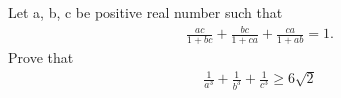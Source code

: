 \item Let a, b, c be positive real number such that
\begin{align*}
\frac{ac}{1+bc} + \frac{bc}{1+ca} + \frac{ca}{1+ab} = 1.
\end{align*}
Prove that 
\begin{align*}
\frac{1}{a^3} + \frac{1}{b^3} + \frac{1}{c^3} \geq 6\sqrt{2}
\end{align*}
